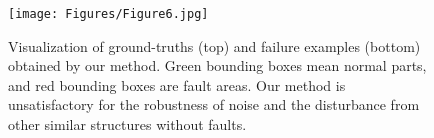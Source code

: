 
\begin{figure}[!t]
  \centering
  \texttt{[image: Figures/Figure6.jpg]}
  \caption{Visualization of ground-truths (top) and failure examples (bottom) obtained by our method. Green bounding boxes mean normal parts, and red bounding boxes are fault areas. Our method is unsatisfactory for the robustness of noise and the disturbance from other similar structures without faults.}
  \label{QFresults}
\end{figure}
